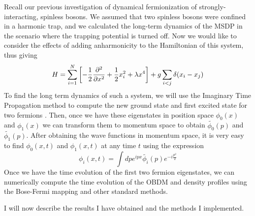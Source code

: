 \documentclass[onecolumn,english,aps,pra]{revtex4}
\begin{document}
Recall our previous investigation of dynamical fermionization of strongly-interacting, spinless bosons. We assumed that two spinless bosons were confined in a harmonic trap, and we calculated the long-term dynamics of the MSDP in the scenario where the trapping potential is turned off. Now we would like to consider the effects of adding anharmonicity to the Hamiltonian of this system, thus giving 
\begin{equation}
    H = \sum_{i = 1}^{N} \left[ -\frac{1}{2} \pdv[2]{}{x} + \frac{1}{2} x_i^2 + \lambda x^4 \right]
            + g \sum_{i < j} \delta(x_i - x_j)
\end{equation}
To find the long term dynamics of such a system, we will use the Imaginary Time Propagation method to compute the new ground state and first excited state for two fermions \cite{chiofalo2000ground, muruganandam2009fortran}. Then, once we have these eigenstates in position space $\phi_0(x)$ and $\phi_1(x)$ we can transform them to momentum space to obtain $\widetilde{\phi_0}(p)$ and $\widetilde{\phi_1}(p)$. After obtaining the wave functions in momentum space, it is very easy to find $\phi_0(x,t)$ and $\phi_1(x,t)$ at any time $t$ using the expression
\begin{equation}
\phi_i(x,t) = \int dp e^{ipx} \widetilde{\phi_i}(p) e^{-i\frac{p^2}{2}}
\end{equation}
Once we have the time evolution of the first two fermion eigenstates, we can numerically compute the time evolution of the OBDM and density profiles using the Bose-Fermi mapping and other standard methods.

I will now describe the results I have obtained and the methods I implemented.











\pagebreak


\end{document}
